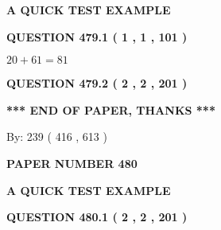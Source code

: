 \documentclass[12pt]{article}
\begin{document}
   
\vspace{0.2in}
   
   
   
   
   
   
 \vspace{0.2in}
{\LARGE {\textbf{ A QUICK TEST EXAMPLE}}}
   
   
  
\vspace{0.2in}
  
{\textbf{\Large{QUESTION
479.1 
 ( 1 , 1 , 101 )
}}}
  
  
 
 

$ %
20 +  %
61=   %
81$
 
 
  
\vspace{0.2in}
  
{\textbf{\Large{QUESTION
479.2 
 ( 2 , 2 , 201 )
}}}
  
  
   
   
 \vspace{0.2in}
 
   
   
   
   
\vspace{1.0in} 
{\textbf{\large{ *** END OF PAPER, THANKS *** }}} 
   
   
\hspace{1.0in} By: 
 239 ( 416 ,  613 )
   
   
   
   
\newpage 
\setcounter{page}{ 
   480001 } 
   
   
   
   
 {\textbf{ \Large{ PAPER NUMBER  480  }}}
   
   
\vspace{0.2in}
   
   
   
   
   
   
 \vspace{0.2in}
{\LARGE {\textbf{ A QUICK TEST EXAMPLE}}}
   
   
  
\vspace{0.2in}
  
{\textbf{\Large{QUESTION
480.1 
 ( 2 , 2 , 201 )
}}}
  
\end{document}
